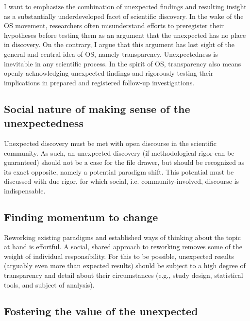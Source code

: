 \documentclass[authordate, commentary]{jote-new-article}
\begin{document}
	I want to emphasize the combination of unexpected findings and resulting insight as a substantially underdeveloped facet of scientific discovery. In the wake of the OS movement, researchers often misunderstand efforts to preregister their hypotheses before testing them as an argument that the unexpected has no place in discovery. On the contrary, I argue that this argument has lost sight of the general and central idea of OS, namely transparency. Unexpectedness is inevitable in any scientific process. In the spirit of OS, transparency also means openly acknowledging unexpected findings and rigorously testing their implications in prepared and registered follow-up investigations.



	\subsection{Social nature of making sense of the unexpectedness}



	Unexpected discovery must be met with open discourse in the scientific community. As such, an unexpected discovery (if methodological rigor can be guaranteed) should not be a case for the file drawer, but should be recognized as its exact opposite, namely a potential paradigm shift. This potential must be discussed with due rigor, for which social, i.e. community-involved, discourse is indispensable.



	\subsection{Finding momentum to change}



	Reworking existing paradigms and established ways of thinking about the topic at hand is effortful. A social, shared approach to reworking removes some of the weight of individual responsibility. For this to be possible, unexpected results (arguably even more than expected results) should be subject to a high degree of transparency and detail about their circumstances (e.g., study design, statistical tools, and subject of analysis).



	\subsection{Fostering the value of the unexpected}
\end{document}
